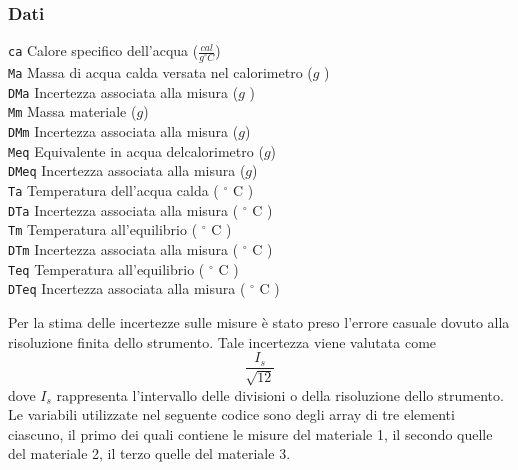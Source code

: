\documentclass[11pt]{article}
\begin{document}
\hypertarget{dati}{%
\subsubsection{Dati}\label{dati}}

\texttt{ca} Calore specifico dell'acqua (\(\frac{cal}{g ^\circ C}\))\\
\texttt{Ma} Massa di acqua calda versata nel calorimetro (\(g\) )\\
\texttt{DMa} Incertezza associata alla misura (\(g\) )\\
\texttt{Mm} Massa materiale (\(g\))\\
\texttt{DMm} Incertezza associata alla misura (\(g\))\\
\texttt{Meq} Equivalente in acqua delcalorimetro (\(g\))\\
\texttt{DMeq} Incertezza associata alla misura (\(g\))\\
\texttt{Ta} Temperatura dell'acqua calda ( $ ^{\circ}$ C )\\
\texttt{DTa} Incertezza associata alla misura ( $ ^{\circ}$ C )\\
\texttt{Tm} Temperatura all'equilibrio ( $ ^{\circ}$ C )\\
\texttt{DTm} Incertezza associata alla misura  ( $ ^{\circ}$ C )\\
\texttt{Teq} Temperatura all'equilibrio ( $ ^{\circ}$ C )\\
\texttt{DTeq} Incertezza associata alla misura  ( $ ^{\circ}$ C )


Per la stima delle incertezze sulle misure è stato preso l'errore
casuale dovuto alla risoluzione finita dello strumento. Tale incertezza
viene valutata come \[ \frac{I_{s}}{\sqrt{12}}\] dove \(I_{s}\)
rappresenta l'intervallo delle divisioni o della risoluzione dello
strumento.\\
Le variabili utilizzate nel seguente codice sono degli array di tre
elementi ciascuno, il primo dei quali contiene le misure del materiale
1, il secondo quelle del materiale 2, il terzo quelle del materiale 3.
\end{document}
